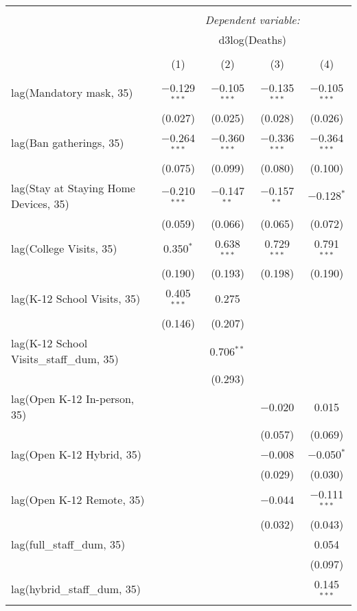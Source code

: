 \begin{tabular}{@{\extracolsep{1pt}}lcccc} 
\\[-1.8ex]\hline 
\hline \\[-1.8ex] 
 & \multicolumn{4}{c}{\textit{Dependent variable:}} \\ 
\cline{2-5} 
 & \multicolumn{4}{c}{d3log(Deaths)} \\ 
\\[-1.8ex] & (1) & (2) & (3) & (4)\\ 
\hline \\[-1.8ex] 
 lag(Mandatory mask, 35) & $-$0.129$^{***}$ & $-$0.105$^{***}$ & $-$0.135$^{***}$ & $-$0.105$^{***}$ \\ 
  & (0.027) & (0.025) & (0.028) & (0.026) \\ 
  lag(Ban gatherings, 35) & $-$0.264$^{***}$ & $-$0.360$^{***}$ & $-$0.336$^{***}$ & $-$0.364$^{***}$ \\ 
  & (0.075) & (0.099) & (0.080) & (0.100) \\ 
  lag(Stay at Staying Home Devices, 35) & $-$0.210$^{***}$ & $-$0.147$^{**}$ & $-$0.157$^{**}$ & $-$0.128$^{*}$ \\ 
  & (0.059) & (0.066) & (0.065) & (0.072) \\ 
  lag(College Visits, 35) & 0.350$^{*}$ & 0.638$^{***}$ & 0.729$^{***}$ & 0.791$^{***}$ \\ 
  & (0.190) & (0.193) & (0.198) & (0.190) \\ 
  lag(K-12 School Visits, 35) & 0.405$^{***}$ & 0.275 &  &  \\ 
  & (0.146) & (0.207) &  &  \\ 
  lag(K-12 School Visits\_staff\_dum, 35) &  & 0.706$^{**}$ &  &  \\ 
  &  & (0.293) &  &  \\ 
  lag(Open K-12 In-person, 35) &  &  & $-$0.020 & 0.015 \\ 
  &  &  & (0.057) & (0.069) \\ 
  lag(Open K-12 Hybrid, 35) &  &  & $-$0.008 & $-$0.050$^{*}$ \\ 
  &  &  & (0.029) & (0.030) \\ 
  lag(Open K-12 Remote, 35) &  &  & $-$0.044 & $-$0.111$^{***}$ \\ 
  &  &  & (0.032) & (0.043) \\ 
  lag(full\_staff\_dum, 35) &  &  &  & 0.054 \\ 
  &  &  &  & (0.097) \\ 
  lag(hybrid\_staff\_dum, 35) &  &  &  & 0.145$^{***}$ \\ 

\end{tabular}

